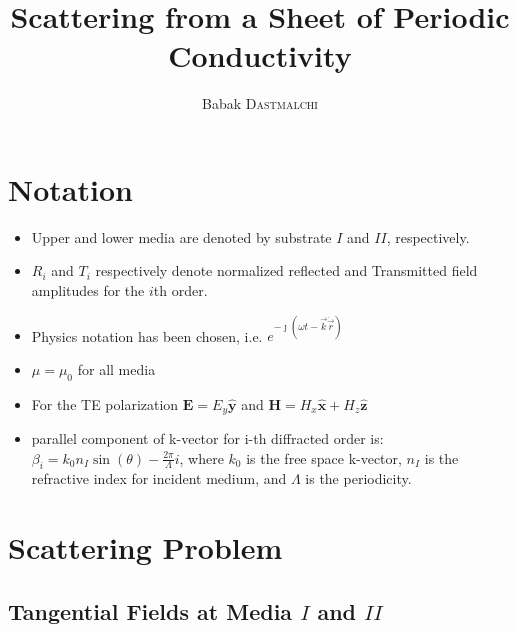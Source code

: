 \documentclass{article}
\title{Scattering from a Sheet of Periodic Conductivity} %
\author{Babak \textsc{Dastmalchi}} %
\begin{document}
\maketitle %





\section{Notation}

\begin{itemize}
\item Upper and lower media are denoted by substrate $I$ and $II$, respectively. 
\item $R_i$ and $T_i$ respectively denote normalized reflected and Transmitted field amplitudes for the $i$th order.
\item Physics notation has been chosen, i.e. $e^{-\jmath\left(\omega t - \vec{k}\dot\vec{r}\right) }$
\item $\mu=\mu_0$ for all media
\item For the TE polarization $\mathbf{E}=E_y\mathbf{\hat{y}}$ and $\mathbf{H}=H_x\mathbf{\hat{x}}+H_z\mathbf{\hat{z}}$
\item parallel component of k-vector for i-th diffracted order is: $\beta_i=k_0 n_I \sin(\theta) - \frac{2\pi}{\Lambda} i$, where $k_0$ is the free space k-vector, $n_I$ is the refractive index for incident medium, and $\Lambda$ is the periodicity.
\end{itemize}





\section{Scattering Problem}

\subsection{Tangential Fields at Media $I$ and $II$}
\end{document}
